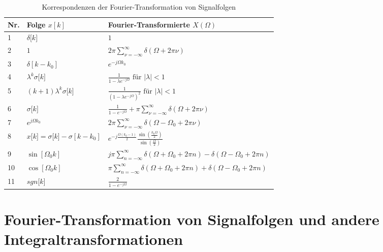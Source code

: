 \begin{table}
  \centering
  \caption{Korrespondenzen der Fourier-Transformation von Signalfolgen}
  \label{tab:7.5}
  \begin{tabular}{lll}
    \toprule
    Nr. & Folge \(x[k]\) & Fourier-Transformierte \(X(Ω)\) \\
    \midrule
    1 & \(\delta\lbrack k\rbrack\) & \(1\) \\
    2 & \(1\) & \(2  \pi  \sum\limits_{\nu = - \infty}^{\infty}{\delta(\Omega + 2  \pi  \nu)}\) \\
    3 & \(\delta\left\lbrack k - k_{0} \right\rbrack\) & \(e^{- j  \Omega  k_{0}}\) \\
    4 & \(\lambda^{k}  \sigma\lbrack k\rbrack\) & \(\frac{1}{1 - \lambda  e^{- j  \Omega}}\text{        für  }|\lambda| < 1\) \\
    5 & \((k + 1)  \lambda^{k}  \sigma\lbrack k\rbrack\) & \(\frac{1}{\left( 1 - \lambda  e^{- j  \Omega} \right)^{2}}\text{   für  }|\lambda| < 1\) \\
    6 & \(\sigma\lbrack k\rbrack\) & \(\frac{1}{1 - e^{- j  \Omega}} + \pi  \sum\limits_{\nu = - \infty}^{\infty}{\delta(\Omega + 2  \pi  \nu)}\) \\
    7 & \(e^{j  \Omega  k_{0}}\) & \(2  \pi  \sum\limits_{\nu = - \infty}^{\infty}{\delta\left( \Omega - \Omega_{0} + 2  \pi  \nu \right)}\) \\
    8 & \(x\lbrack k\rbrack = \sigma\lbrack k\rbrack - \sigma\left\lbrack k - k_{0} \right\rbrack\) & \(e^{- j  \frac{\Omega  \left( k_{0} - 1 \right)}{2}}  \frac{\sin\left( \frac{k_{0}  \Omega}{2} \right)}{\sin\left( \frac{\Omega}{2} \right)}\) \\
    9 & \(\sin\left\lbrack \Omega_{0}  k \right\rbrack\) & \(j  \pi  \sum\limits_{n = - \infty}^{\infty}{\delta\left( \Omega + \Omega_{0} + 2  \pi  n \right) - \delta\left( \Omega - \Omega_{0} + 2  \pi  n \right)}\) \\
    10 & \(\cos\left\lbrack \Omega_{0}  k \right\rbrack\) & \(\pi  \sum\limits_{n = - \infty}^{\infty}{\delta\left( \Omega + \Omega_{0} + 2  \pi  n \right) + \delta\left( \Omega - \Omega_{0} + 2  \pi  n \right)}\) \\
    11 & \({sgn}\lbrack k\rbrack\) & \(\frac{2}{1 - e^{- j  \Omega}}\) \\
    \bottomrule
  \end{tabular}
\end{table}

\section{Fourier-Transformation von Signalfolgen und andere Integraltrans\-formationen}\label{sec:7.3}

